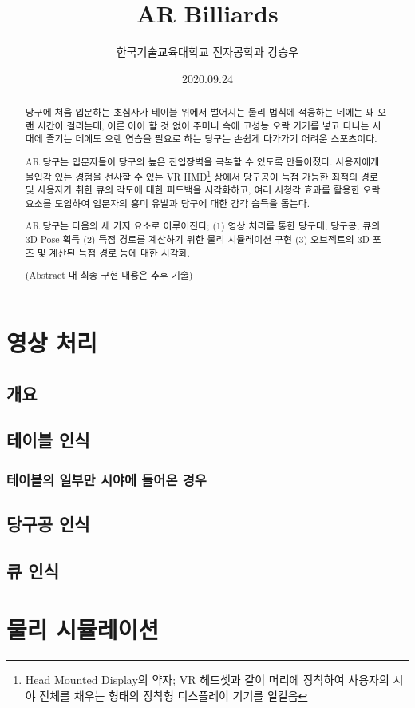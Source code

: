 \documentclass[11pt]{oblivoir}
\title{AR Billiards}
\author{한국기술교육대학교 전자공학과 강승우}
\date{2020.09.24}
\begin{document}
\maketitle
\tableofcontents

\begin{abstract}
당구에 처음 입문하는 초심자가 테이블 위에서 벌어지는 물리 법칙에 적응하는 데에는 꽤 오랜 시간이 걸리는데, 어른 아이 할 것 없이 주머니 속에 고성능 오락 기기를 넣고 다니는 시대에 즐기는 데에도 오랜 연습을 필요로 하는 당구는 손쉽게 다가가기 어려운 스포츠이다. 

AR 당구는 입문자들이 당구의 높은 진입장벽을 극복할 수 있도록 만들어졌다. 사용자에게 몰입감 있는 경험을 선사할 수 있는 VR HMD\footnote{Head Mounted Display의 약자; VR 헤드셋과 같이 머리에 장착하여 사용자의 시야 전체를 채우는 형태의 장착형 디스플레이 기기를 일컬음} 상에서 당구공이 득점 가능한 최적의 경로 및 사용자가 취한 큐의 각도에 대한 피드백을 시각화하고, 여러 시청각 효과를 활용한 오락 요소를 도입하여 입문자의 흥미 유발과 당구에 대한 감각 습득을 돕는다.

AR 당구는 다음의 세 가지 요소로 이루어진다; (1) 영상 처리를 통한 당구대, 당구공, 큐의 3D Pose 획득 (2) 득점 경로를 계산하기 위한 물리 시뮬레이션 구현 (3) 오브젝트의 3D 포즈 및 계산된 득점 경로 등에 대한 시각화.

(Abstract 내 최종 구현 내용은 추후 기술)
\end{abstract}

\section{영상 처리}
\subsection{개요}

\subsection{테이블 인식}
\subsubsection{테이블의 일부만 시야에 들어온 경우}

\subsection{당구공 인식}

\subsection{큐 인식}

\section{물리 시뮬레이션}
\end{document}

